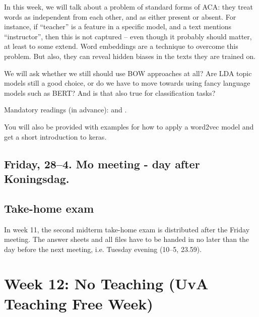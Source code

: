 In this week, we will talk about a problem of standard forms of ACA: they treat words as independent from each other, and as either present or absent. For instance, if ``teacher'' is a feature in a specific model, and a text mentions ``instructor'', then this is not captured -- even though it probably should matter, at least to some extend. Word embeddings are a technique to overcome this problem. But also, they can reveal hidden biases in the texts they are trained on.

We will ask whether we still should use BOW approaches at all? Are LDA topic models still a good choice, or do we have to move towards using fancy language models such as BERT? And is that also true for classification tasks?






Mandatory readings (in advance): \cite{Kusner2015} and \cite{Garg2017}.


You will also be provided with examples for how to apply a word2vec model and get a short introduction to keras.


\subsection*{Friday, 28--4. Mo meeting - day after Koningsdag.}


\subsection*{Take-home exam}
In week 11, the second midterm take-home exam is distributed after the Friday meeting. The answer sheets and all files have to be handed in no later than the day before the next meeting, i.e. Tuesday evening (10--5, 23.59).





\section*{Week 12: No Teaching (UvA Teaching Free Week)}

